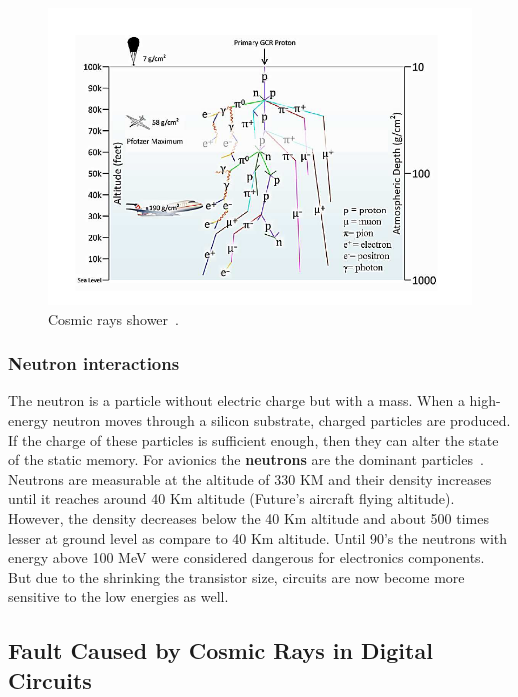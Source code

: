 \begin{figure}[h]
 \centering
  \captionsetup{justification=centering}    
   \includegraphics[scale=0.75]{Figures/showerplusaircraft.png}
  \caption{Cosmic rays shower~\cite{ziegler1996ibm}.}
\label{shower}
\end{figure}


\subsubsection{Neutron interactions}



The neutron is a particle without electric charge but with a mass. When a high-energy neutron moves through a silicon substrate, charged particles are produced. If the charge of these particles is sufficient enough, then they can alter the state of the static memory.  For avionics the \textbf{neutrons} are the dominant particles~\citep{xilinnseu}. Neutrons are measurable at the altitude of 330 KM and their density increases until it reaches around 40 Km altitude (Future's aircraft flying altitude). However, the density decreases below the 40 Km altitude and about 500 times lesser at ground level as compare to 40 Km altitude. Until 90's the neutrons with energy above 100 MeV were considered dangerous for electronics components. But due to the shrinking the transistor size, circuits are now become more sensitive to the low energies as well.   

\subsection{Fault Caused by Cosmic Rays in Digital Circuits}


